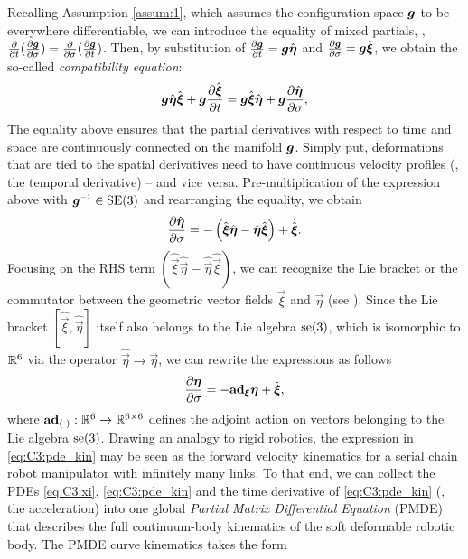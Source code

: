 Recalling Assumption \ref{assum:1}, which assumes the configuration space $\boldsymbol{g}$ to be everywhere differentiable, we can introduce the equality of mixed partials, \ie, $\frac{\partial }{\partial t}(\frac{\partial \boldsymbol{g}}{\partial \sigma}) = \frac{\partial }{\partial \sigma} (\frac{\partial \boldsymbol{g}}{\partial t})$. Then, by substitution of $\frac{\partial \boldsymbol{g}}{\partial t} = \boldsymbol{g}\hat{\boldsymbol{\eta}}$ and $\frac{\partial \boldsymbol{g}}{\partial \sigma} = \boldsymbol{g}\hat{\boldsymbol{\xi}}$, we obtain the so-called \emph{compatibility equation}:
%
\begin{equation}
\boldsymbol{g} \hat{\boldsymbol{\eta}}\hat{\boldsymbol{\xi}} + \boldsymbol{g} \frac{\partial \hat{\boldsymbol{\xi}}}{\partial t}  = \boldsymbol{g} \hat{\boldsymbol{\xi}} \hat{\boldsymbol{\eta}}  + \boldsymbol{g} \frac{\partial \hat{\boldsymbol{\eta}}}{\partial \sigma},
\label{eq:C3:compatibility}
\end{equation}
%
\noindent
The equality above ensures that the partial derivatives with respect to time and space are continuously connected on the manifold ${\boldsymbol{g}}$. Simply put, deformations that are tied to the spatial derivatives need to have continuous velocity profiles (\ie, the temporal derivative) -- and vice versa. Pre-multiplication of the expression above with $\mat{g} \inv \in \SE{3}$ and rearranging the equality, we obtain
%
\begin{equation}
\frac{\partial \hat{\boldsymbol{\eta}}}{\partial \sigma} = -\left(\hat{\boldsymbol{\xi}}\hat{\boldsymbol{\eta}} - \hat{\boldsymbol{\eta}}\hat{\boldsymbol{\xi}} \right) + \dot{\hat{\boldsymbol{\xi}}}.
\end{equation}
%
\noindent Focusing on the RHS term $(\hat{\vec{\xi}}\hat{\vec{\eta}} - \hat{\vec{\eta}}\hat{\vec{\xi}})$, we can recognize the Lie bracket or the commutator between the geometric vector fields $\vec{\xi}$ and $\vec{\eta}$ (see \cite{Murray1994}). Since the Lie bracket $[\hat{\vec{\xi}},\hat{\vec{\eta}}]$ itself also belongs to the Lie algebra $\textup{\textrm{se}}(3)$, which is isomorphic to $\mathbb{R}^6$ via the operator $\hat{\vec{\eta}} \to \vec{\eta}$, we can rewrite the expressions as follows
%
\begin{equation}
\frac{\partial \boldsymbol{\eta}}{\partial \sigma} = -\textbf{ad}_{\boldsymbol{\xi}}\boldsymbol{\eta} + \dot{\boldsymbol{\xi}},
\label{eq:C3:pde_kin}
\end{equation}
%
\noindent where $\textbf{ad}_{(\cdot)}: \mathbb{R}^6 \to \mathbb{R}^{6\times 6}$ defines the adjoint action on vectors belonging to the Lie algebra $\textup{\textrm{se}}(3)$. %
Drawing an analogy to rigid robotics, the expression in \eqref{eq:C3:pde_kin} may be seen as the forward velocity kinematics for a serial chain robot manipulator with infinitely many links. To that end, we can collect the PDEs \eqref{eq:C3:xi}, \eqref{eq:C3:pde_kin} and the time derivative of \eqref{eq:C3:pde_kin} (\ie, the acceleration) into one global \textit{Partial Matrix Differential Equation} (PMDE) that describes the full continuum-body kinematics of the soft deformable robotic body. The PMDE curve kinematics takes the form
